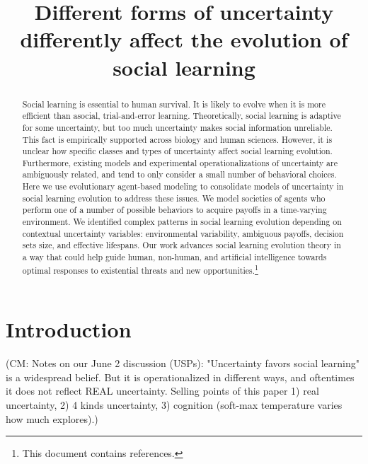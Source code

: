 \documentclass[letterpaper,11.5pt]{scrartcl}
\title{Different forms of uncertainty differently affect the evolution of social learning}
\author{{}}
\newcommand{\cm}[1]{{\textcolor{mypurple} {({\tiny CM:} #1)}}}
\begin{document}
\maketitle

\newcommand{\pisub}[1]{\pi_{\mathrm{#1}}}
\newcommand{\pilow}{\pisub{low}}
\newcommand{\pihigh}{\pisub{high}}
\newcommand{\piI}{\langle \pisub{I} \rangle}
\newcommand{\piS}{\langle \pisub{S} \rangle}
\newcommand{\ledger}{\bar\pi_{ib}}

\newcommand{\meanvar}[1]{\langle #1 \rangle}
\newcommand{\meansl}{\meanvar{s}}
\newcommand{\meanpi}{\meanvar{\pi}}
\newcommand{\meansoc}{\meanvar{\pi_\mathrm{S}}}
\newcommand{\meanasoc}{\meanvar{\pi_\mathrm{A}}}
\newcommand{\meanT}{\meanvar{T}}

\newcommand{\bandit}{\text{Bandit}_b(0, 1)}

\begin{abstract}

Social learning is essential to human survival. It is likely to evolve when it is more
efficient than asocial, trial-and-error learning. Theoretically, social learning
is adaptive for some uncertainty, but too much uncertainty makes
social information unreliable. This fact is empirically
supported across biology and human sciences. However, it is unclear how
specific classes and types of uncertainty affect social
learning evolution. Furthermore, existing models and experimental operationalizations of
uncertainty are ambiguously related, and 
tend to only consider a small number of behavioral
choices.  Here we use evolutionary agent-based modeling to consolidate
models of uncertainty in social learning evolution to address these issues.
We model societies of agents who perform one of a number
of possible behaviors to acquire payoffs in a time-varying environment.
We identified complex patterns in social learning evolution depending on contextual
uncertainty variables: environmental variability, ambiguous payoffs, 
decision sets size, and effective lifespans. 
Our work advances social learning evolution theory in a way that could help 
guide human, non-human, and artificial intelligence towards optimal responses 
to existential threats and new opportunities.\footnote{This document contains
 references.}  
\end{abstract}


\section{Introduction}
\cm{Notes on our June 2 discussion (USPs): "Uncertainty favors social learning" is a widespread belief. But it is operationalized in different ways, and oftentimes it does not reflect REAL uncertainty. Selling points of this paper 1) real uncertainty, 2) 4 kinds uncertainty, 3) cognition (soft-max temperature varies how much explores).}
\end{document}
